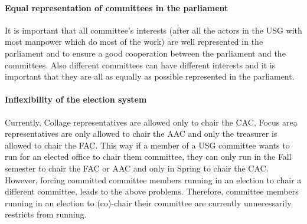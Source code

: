 \paragraph{Equal representation of committees in the parliament}
It is important that all committee's interests (after all the actors in the USG with most manpower which do most of the work) are well represented in the parliament and to ensure a good cooperation between the parliament and the committees. Also different committees can have different interests and it is important that they are all as equally as possible represented in the parliament. 

\paragraph{Inflexibility of the election system}
Currently, Collage representatives are allowed only to chair the CAC, Focus area representatives are only allowed to chair the AAC and only the treasurer is allowed to chair the FAC. This way if a member of a USG committee wants to run for an elected office to chair them committee, they can only run in the Fall semester to chair the FAC or AAC and only in Spring to chair the CAC. However, forcing committed committee members running in an election to chair a different committee, leads to the above problems. Therefore, committee members running in an election to (co)-chair their committee are currently unnecessarily restricts from running. 